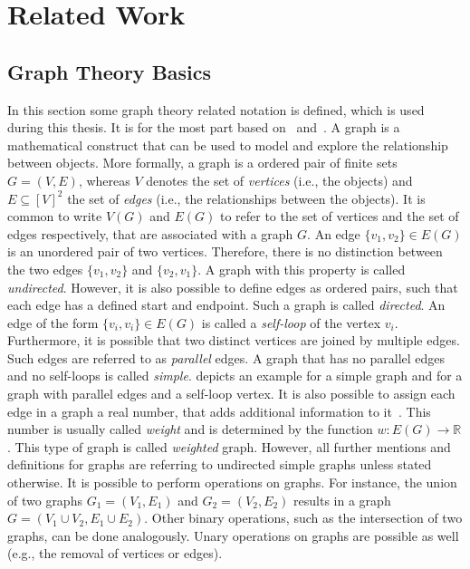 \chapter{Related Work}
\label{cha:related-work}


\section{Graph Theory Basics}
\label{sec:graph-theory-basics}

In this section some graph theory related notation is defined, which is used during this thesis.
It is for the most part based on~\cite{Thulasiraman1992} and~\cite{Diestel2012}.
A graph is a mathematical construct that can be used to model and explore the relationship between objects.
More formally, a graph is a ordered pair of finite sets \(G = (V, E)\), whereas \(V\) denotes the set of \emph{vertices} (i.e., the objects) and \(E \subseteq [V]^{2} \) the set of \emph{edges} (i.e., the relationships between the objects).
It is common to write \(V(G)\) and \(E(G)\) to refer to the set of vertices and the set of edges respectively, that are associated with a graph \(G\).
An edge \(\{v_1, v_2\} \in E(G)\) is an unordered pair of two vertices.
Therefore, there is no distinction between the two edges \(\{v_1, v_2 \}\) and \(\{v_2, v_1\}\).
A graph with this property is called \emph{undirected}.
However, it is also possible to define edges as ordered pairs, such that each edge has a defined start and endpoint.
Such a graph is called \emph{directed}.
An edge of the form \(\{v_i, v_i\} \in E(G)\) is called a \emph{self-loop} of the vertex \(v_i\).
Furthermore, it is possible that two distinct vertices are joined by multiple edges.
Such edges are referred to as \emph{parallel} edges.
A graph that has no parallel edges and no self-loops is called \emph{simple}.
 depicts an example for a simple graph and for a graph with parallel edges and a self-loop vertex.
It is also possible to assign each edge in a graph a real number, that adds additional information to it~\cite{Cormen2009}.
This number is usually called \emph{weight} and is determined by the function \(w : E(G) \rightarrow \mathbb{R}\).
This type of graph is called \emph{weighted} graph.
However, all further mentions and definitions for graphs are referring to undirected simple graphs unless stated otherwise.
It is possible to perform operations on graphs.
For instance, the union of two graphs \(G_{1} = (V_{1}, E_{1})\) and \(G_{2} = (V_{2}, E_{2})\) results in a graph \(G = (V_{1} \cup V_{2}, E_{1} \cup E_{2})\).
Other binary operations, such as the intersection of two graphs, can be done analogously.
Unary operations on graphs are possible as well (e.g., the removal of vertices or edges).

